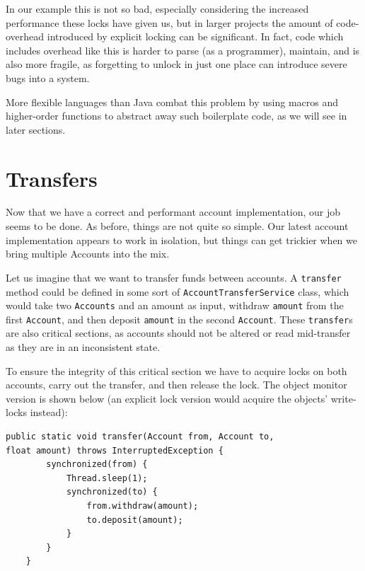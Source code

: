 \documentclass[a4paper,12pt]{kth-mag}
\begin{document}
In our example this is not so bad, especially considering the increased performance these locks have given us, but in larger projects the amount of code-overhead introduced by explicit locking can be significant. In fact, code which includes overhead like this is harder to parse (as a programmer), maintain, and is also more fragile, as forgetting to unlock in just one place can introduce severe bugs into a system.

More flexible languages than Java combat this problem by using macros and higher-order functions to abstract away such boilerplate code, as we will see in later sections.

\section{Transfers}

Now that we have a correct and performant account implementation, our job seems to be done. As before, things are not quite so simple. Our latest account implementation appears to work in isolation, but things can get trickier when we bring multiple Accounts into the mix.

Let us imagine that we want to transfer funds between accounts. A \texttt{transfer} method could be defined in some sort of \texttt{AccountTransferService} class, which would take two \texttt{Accounts} and an amount as input, withdraw \texttt{amount} from the first \texttt{Account}, and then deposit \texttt{amount} in the second \texttt{Account}. These \texttt{transfer}s are also critical sections, as accounts should not be altered or read mid-transfer as they are in an inconsistent state.

To ensure the integrity of this critical section we have to acquire locks on both accounts, carry out the transfer, and then release the lock. The object monitor version is shown below (an explicit lock version would acquire the objects' write-locks instead):

\begin{listing}[H]
	\begin{verbatim}
public static void transfer(Account from, Account to,
float amount) throws InterruptedException {
        synchronized(from) {
            Thread.sleep(1);
            synchronized(to) {
                from.withdraw(amount);
                to.deposit(amount);
            }
        }
    }
	\end{verbatim}
\end{listing}
\end{document}

